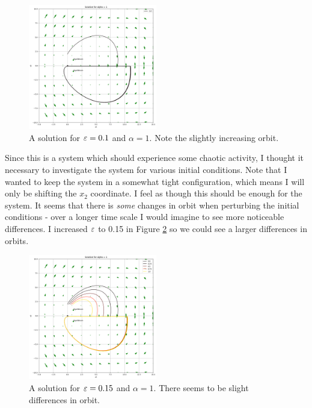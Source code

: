 \begin{solution}
    \jump
    \begin{figure}[!ht]
    \centering
    \includegraphics[width = 0.5\textwidth]{Images/longer orbits.png}
    \caption{A solution for $\varepsilon = 0.1$ and $\alpha = 1$. Note the slightly increasing orbit.}
    \label{png:increasing orbit}
    \end{figure}

    \vspace{\floatsep}
    \clearpage

    Since this is a system which should experience some chaotic activity, I thought it necessary to investigate the system for various initial conditions. Note that I wanted to keep the system in a somewhat tight configuration, which means I will only be shifting the $x_2$ coordinate. I feel as though this should be enough for the system. It seems that there is \textit{some} changes in orbit when perturbing the initial conditions - over a longer time scale I would imagine to see more noticeable differences. I increased $\varepsilon$ to 0.15 in Figure \ref{png:initial conditions} so we could see a larger differences in orbits. 

    \jump
    \begin{figure}[!ht]
    \centering
    \includegraphics[width = 0.5\textwidth]{Images/initial conditions.png}
    \caption{A solution for $\varepsilon = 0.15$ and $\alpha = 1$. There seems to be slight differences in orbit.}
    \label{png:initial conditions}
    \end{figure}


\end{solution}
